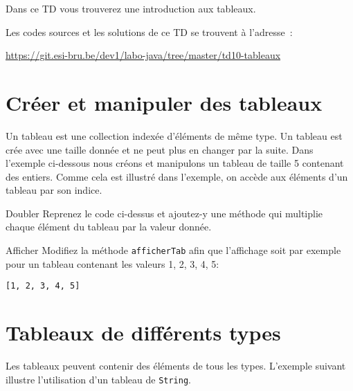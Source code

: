 \documentclass[a4paper,11pt]{article}
\date{2018 -- 2019}
\newcommand{\publicbasepath}{https://git.esi-bru.be/dev1/labo-java/tree/master/td10-tableaux}
\begin{document}
\entete
\titre
{}
\lastedit


	Dans ce TD vous trouverez une introduction aux tableaux.
	 
	Les codes sources et les solutions de ce TD se trouvent à l'adresse~: 
	
	\url{\publicbasepath}	


	\tableofcontents

	\newpage

\section{Créer et manipuler des tableaux}

	Un tableau est une collection indexée d'éléments de même type.
	Un tableau est crée avec une taille donnée et ne peut plus en changer 
	par la suite. Dans l'exemple ci-dessous nous créons et manipulons
	un tableau de taille 5 contenant des entiers.
	Comme cela est illustré dans l'exemple, on accède aux éléments 
	d'un tableau par son indice.

	\bigskip 


 	\begin{Exercice}{Doubler}	
		Reprenez le code ci-dessus et ajoutez-y une méthode 
		 qui
		 multiplie chaque élément du tableau par la valeur donnée.
	\end{Exercice}
	
	\bigskip
	
	\begin{Exercice}{Afficher}
		Modifiez la méthode \texttt{afficherTab} afin que l'affichage soit par exemple pour un tableau contenant les valeurs 1, 2, 3, 4, 5:
		
		\texttt{[1, 2, 3, 4, 5]}
	\end{Exercice}


\section{Tableaux de différents types}
	Les tableaux peuvent contenir des éléments de tous les types.	
	L'exemple suivant illustre l'utilisation d'un tableau de \texttt{String}.

\end{document}
